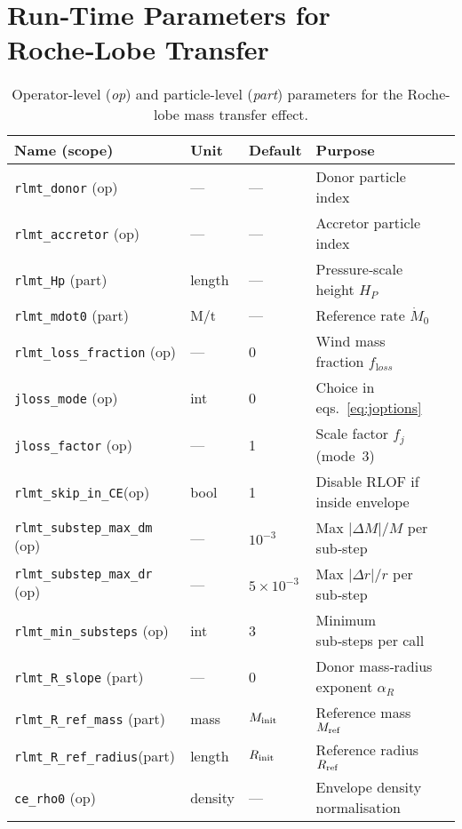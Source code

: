 \documentclass[11pt]{article}
\begin{document}
\section{Run‑Time Parameters for Roche‑Lobe Transfer}
\label{sec:param_table}

\begin{table}[h]
\centering\footnotesize
\caption{Operator-level (\textit{op}) and particle-level (\textit{part}) parameters for the
Roche-lobe mass transfer effect.}
\label{tab:params}
\begin{tabular}{@{}lllll@{}}
\toprule
Name (scope) & Unit & Default & Purpose \\
\midrule
\texttt{rlmt\_donor}      (op)   & —        & — & Donor particle index\\
\texttt{rlmt\_accretor}   (op)   & —        & — & Accretor particle index\\
\texttt{rlmt\_Hp}         (part) & length   & — & Pressure‐scale height $H_P$\\
\texttt{rlmt\_mdot0}      (part) & M/t      & — & Reference rate $\dot M_0$\\[0.2em]
%
\texttt{rlmt\_loss\_fraction} (op) & —      & 0 & Wind mass fraction $f_{\mathrm loss}$\\
\texttt{jloss\_mode}      (op)   & int      & 0 & Choice in eqs.~\eqref{eq:joptions}\\
\texttt{jloss\_factor}    (op)   & —        & 1 & Scale factor $f_j$ (mode 3)\\
\texttt{rlmt\_skip\_in\_CE}(op)  & bool     & 1 & Disable RLOF if inside envelope\\[0.2em]
%
\texttt{rlmt\_substep\_max\_dm} (op) & —    & $10^{-3}$ & Max $|\Delta M|/M$ per sub‑step\\
\texttt{rlmt\_substep\_max\_dr} (op) & —    & $5\times10^{-3}$ & Max $|\Delta r|/r$ per sub‑step\\
\texttt{rlmt\_min\_substeps}    (op) & int  & 3 & Minimum sub‑steps per call\\[0.2em]
%
\texttt{rlmt\_R\_slope}      (part) & —     & 0 & Donor mass‑radius exponent $\alpha_R$\\
\texttt{rlmt\_R\_ref\_mass}  (part) & mass  & $M_{\rm init}$ & Reference mass $M_{\rm ref}$\\
\texttt{rlmt\_R\_ref\_radius}(part) & length& $R_{\rm init}$ & Reference radius $R_{\rm ref}$\\[0.2em]
%
\texttt{ce\_rho0}       (op) & density & — & Envelope density normalisation\\

\end{tabular}
\end{table}
\end{document}
